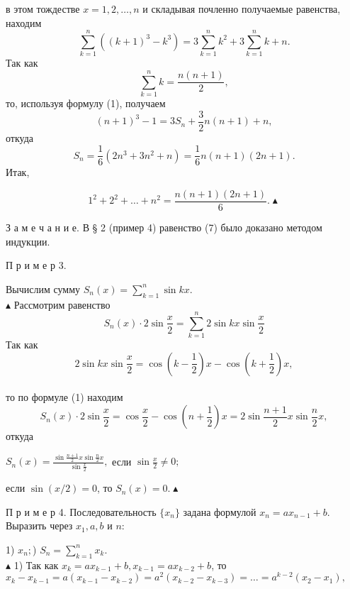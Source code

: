 \documentclass[12pt]{article}
\begin{document}
\setlength{\headsep}{0.4cm}
\setlength{\parindent}{0.4cm}


\pagestyle{fancy}
\fancyhf{} 
\fancyhead[C]{\fontsize{10pt}{10pt}\selectfont\itshape\rightmark}

\fontsize{12pt}{12pt}
\selectfont

{ в этом тождестве $x = 1,2,\dots ,n$ и складывая почленно получаемые равенства, находим
$$\sum_{k=1}^{n} ((k+1)^3-k^3) = 3 \sum_{k=1}^{n} k^2 + 3 \sum_{k=1}^{n} k + n.$$
Так как $$\sum_{k=1}^{n} k = \frac{n(n+1)}{2} ,$$
то, используя формулу (1), получаем $$(n+1)^3 - 1=3S_n + \frac{3}{2} n(n+1) + n,$$
откуда $$S_n = \frac{1}{6} (2n^3 + 3n^2 + n) = \frac{1}{6} n(n+1)(2n+1).$$
Итак,}

\begin{equation}
1^2 + 2^2 + \ldots + n^2 = \frac{n(n+1)(2n+1)}{6}. \blacktriangle \tag{7}
\end{equation}

{З а м е ч а н и е.} {В § 2 (пример 4) равенство (7) было доказано методом индукции.\\}

{П р и м е р 3.} {Вычислим сумму $S_n(x)=\sum\limits_{k=1}^{n}\sin kx.$\\
\indent $\blacktriangle$ Рассмотрим равенство $$S_n(x)\cdot 2\sin \frac{x}{2} = \sum_{k=1}^{n} 2 \sin kx \sin \frac{x}{2}$$
Так как $$ 2 \sin kx \sin \frac{x}{2} = \cos (k - \frac{1}{2})x - \cos (k+\frac{1}{2})x, $$\\
то по формуле (1) находим
$$ S_n(x)\cdot 2 \sin \frac{x}{2} = \cos \frac{x}{2} - \cos (n + \frac{1}{2})x = 2\sin \frac{n+1}{2} x \sin \frac{n}{2}x,$$
откуда
\begin{center}
$S_n(x) = \frac{\sin\frac{n+1}{2}x\sin\frac{n}{2}x}{\sin\frac{x}{2}},$ если $\sin\frac{x}{2}\neq 0;$
\end{center}
если $\sin (x/2) = 0$, то $S_n(x)=0.\blacktriangle$\\
}

{П р и м е р 4.} {Последовательность $\{x_n\}$ задана формулой $x_n=ax_{n-1}+b.$ Выразить через $x_1, a, b$ и $n$:\\} 

{1) $x_n;$) $S_n = \sum\limits_{k=1}^{n} x_k.$\\

\indent $\blacktriangle$ 1) Так как $x_k = ax_{k-1}+b, x_{k-1}=ax_{k-2}+b$, то\\
$x_k-x_{k-1}=a(x_{k-1} - x_{k-2})=a^2(x_{k-2}-x_{k-3})=\ldots=a^{k-2}(x_2-x_1),$
}
\end{document}
